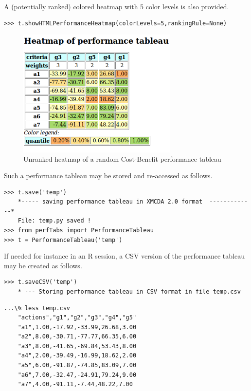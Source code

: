 A (potentially ranked) colored heatmap with 5 color levels is also provided.
\begin{lstlisting}[basicstyle=\footnotesize]
   >>> t.showHTMLPerformanceHeatmap(colorLevels=5,rankingRule=None)
 \end{lstlisting}

 \begin{figure}[h]
\includegraphics[width=8cm]{Figures/randomCBHeatmap.png}
\caption{Unranked heatmap of a random Cost-Benefit performance tableau}
\label{fig:5.2}       %
\end{figure}
 
Such a performance tableau may be stored and re-accessed as follows.

\begin{lstlisting}[basicstyle=\footnotesize]
>>> t.save('temp')
    *----- saving performance tableau in XMCDA 2.0 format  -------------*
    File: temp.py saved !
>>> from perfTabs import PerformanceTableau
>>> t = PerformanceTableau('temp')
\end{lstlisting}

 If needed for instance in an R session, a CSV version of the performance tableau may be created as follows.

\begin{lstlisting}[basicstyle=\footnotesize]
>>> t.saveCSV('temp')
    * --- Storing performance tableau in CSV format in file temp.csv
 \end{lstlisting}

 \begin{lstlisting}[basicstyle=\footnotesize]
   ...\% less temp.csv
    "actions","g1","g2","g3","g4","g5"
    "a1",1.00,-17.92,-33.99,26.68,3.00
    "a2",8.00,-30.71,-77.77,66.35,6.00
    "a3",8.00,-41.65,-69.84,53.43,8.00
    "a4",2.00,-39.49,-16.99,18.62,2.00
    "a5",6.00,-91.87,-74.85,83.09,7.00
    "a6",7.00,-32.47,-24.91,79.24,9.00
    "a7",4.00,-91.11,-7.44,48.22,7.00
\end{lstlisting}

